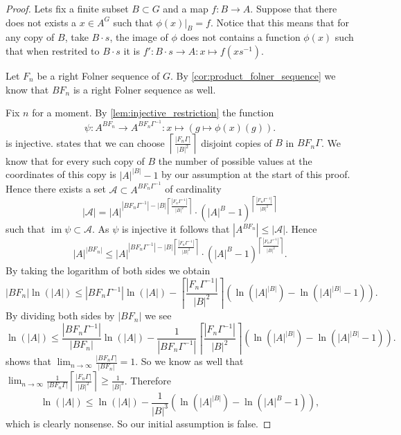 \documentclass[titlepage, a4paper]{article}
\newcommand{\card}[1]{\left| #1 \right|}
\DeclareMathOperator{\im}{im}
\theoremstyle{remark}
\begin{document}
\begin{proof}
	Lets fix a finite subset $B \subset G$ and a map $f:B\to A$. 
	Suppose that there does not exists a  $x \in A^{G}$ such that $\phi(x)|_B = f$.
	Notice that this means that for any copy of $B$, take  $B\cdot s$, the image of $\phi$ does not contains a function  $\phi(x)$ such that when restrited to  $B\cdot s$ it is $f': B\cdot s \to A: x \mapsto f\left( x s^{-1} \right) $.

	Let $F_n$ be a right Folner sequence of $G$. By \cref{cor:product_folner_sequence} we know that $BF_n$ is a right Folner sequence as well. 

	Fix  $n$ for a moment. By \cref{lem:injective_restriction} the function \[
		\psi: A^{BF_n} \to A^{BF_n\Gamma^{-1}}: x \mapsto (g \mapsto \phi(x)(g))
	.\] 
	is injective.
	 states that we can choose  $ \left\lceil \frac{\card{F_n\Gamma}}{\card{B}^2} \right\rceil $ disjoint copies of $B$ in $BF_n\Gamma$. 
	We know that for every such copy of $B$ the number of possible values at the coordinates of this copy is  $\card{A}^{\card{B}} -1$ by our assumption at the start of this proof.
	Hence there exists a set $\mathcal{A} \subset A^{BF_n\Gamma^{-1}}$ of cardinality \[
		\card{\mathcal{A}} = \card{A}^{\card{BF_n\Gamma^{-1}}- \card{B}\left\lceil \frac{\card{F_n\Gamma^{-1}}}{\card{B}^2} \right\rceil } \cdot (\card{A}^{B} -1)^{\left\lceil \frac{\card{F_n\Gamma^{-1}}}{\card{B}^2} \right\rceil }
\]
such that $\im\psi \subset \mathcal{A}$. 
As $\psi$ is injective it follows that $\card{A^{BF_n}} \le \card{\mathcal{A}}$. Hence
\[
	\card{A}^{\card{BF_n}} \le 
	\card{A}^{\card{BF_n\Gamma^{-1}}- \card{B}\left\lceil \frac{\card{F_n\Gamma^{-1}}}{\card{B}^2} \right\rceil } \cdot (\card{A}^{B} -1)^{\left\lceil \frac{\card{F_n\Gamma^{-1}}}{\card{B}^2} \right\rceil }
.\]
By taking the logarithm of both sides we obtain
\[
	\card{BF_n}\ln(\card{A}) \le \card{BF_n\Gamma^{-1}} \ln(\card{A}) - \left\lceil \frac{\card{F_n\Gamma^{-1}}}{\card{B}^2} \right\rceil \left( \ln(\card{A}^{\card{B}}) - \ln(\card{A}^{\card{B}} -1) \right)   
.\]
By dividing both sides by $\card{BF_n}$ we see 
\[
	\ln(\card{A}) \le \frac{\card{BF_n\Gamma^{-1}}}{\card{BF_n}} \ln(\card{A}) - \frac{1}{\card{BF_n\Gamma^{-1}}}\left\lceil \frac{\card{F_n\Gamma^{-1}}}{\card{B}^2} \right\rceil \left( \ln(\card{A}^{\card{B}}) - \ln(\card{A}^{\card{B}} -1) \right)   
.\]
 shows that $\lim_{n \to \infty} \frac{\card{BF_n\Gamma}}{\card{BF_n}} = 1$. 
So we know as well that $\lim_{n \to \infty} \frac{1}{\card{BF_n\Gamma}} \left\lceil \frac{\card{F_n\Gamma}}{\card{B}^2} \right\rceil \ge \frac{1}{\card{B}^3} $. 
Therefore \[
	\ln(\card{A}) \le \ln(\card{A}) - \frac{1}{\card{B}^3} \left(\ln(\card{A}^{\card{B}}) - \ln(\card{A}^{B} - 1) \right)
,\]
which is clearly nonsense. 
So our initial assumption is false. 


\end{proof}
\end{document}
